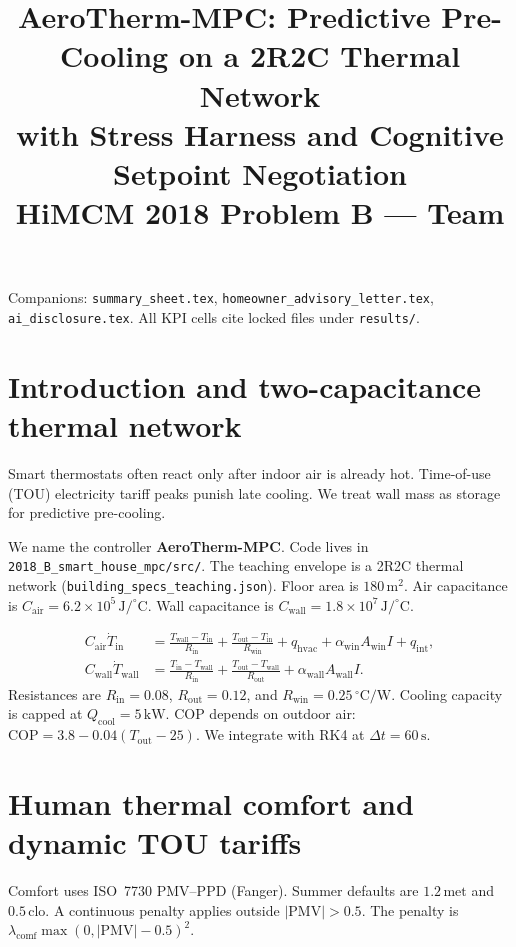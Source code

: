 \documentclass[11pt]{article}
\title{\textbf{AeroTherm-MPC: Predictive Pre-Cooling on a 2R2C Thermal Network\\
with Stress Harness and Cognitive Setpoint Negotiation}\\[0.3em]
\large HiMCM 2018 Problem B --- Team \TeamNumber}
\author{}\date{}
\begin{document}
\maketitle
\thispagestyle{empty}
\noindent
Companions: \texttt{summary\_sheet.tex}, \texttt{homeowner\_advisory\_letter.tex},
\texttt{ai\_disclosure.tex}.
All KPI cells cite locked files under \texttt{results/}.
\tableofcontents
\newpage

\section{Introduction and two-capacitance thermal network}
Smart thermostats often react only after indoor air is already hot.
Time-of-use (TOU) electricity tariff peaks punish late cooling.
We treat wall mass as storage for predictive pre-cooling.

We name the controller \textbf{AeroTherm-MPC}.
Code lives in \texttt{2018\_B\_smart\_house\_mpc/src/}.
The teaching envelope is a 2R2C thermal network
(\texttt{building\_specs\_teaching.json}).
Floor area is $180\,\mathrm{m}^2$.
Air capacitance is $C_{\mathrm{air}}=6.2\times 10^5\,\mathrm{J/^\circ C}$.
Wall capacitance is $C_{\mathrm{wall}}=1.8\times 10^7\,\mathrm{J/^\circ C}$.

\begin{align}
C_{\mathrm{air}}\dot T_{\mathrm{in}}
&=\frac{T_{\mathrm{wall}}-T_{\mathrm{in}}}{R_{\mathrm{in}}}
+\frac{T_{\mathrm{out}}-T_{\mathrm{in}}}{R_{\mathrm{win}}}
+q_{\mathrm{hvac}}+\alpha_{\mathrm{win}}A_{\mathrm{win}}I+q_{\mathrm{int}},\\
C_{\mathrm{wall}}\dot T_{\mathrm{wall}}
&=\frac{T_{\mathrm{in}}-T_{\mathrm{wall}}}{R_{\mathrm{in}}}
+\frac{T_{\mathrm{out}}-T_{\mathrm{wall}}}{R_{\mathrm{out}}}
+\alpha_{\mathrm{wall}}A_{\mathrm{wall}}I.
\end{align}
Resistances are $R_{\mathrm{in}}=0.08$, $R_{\mathrm{out}}=0.12$,
and $R_{\mathrm{win}}=0.25\,^\circ\mathrm{C/W}$.
Cooling capacity is capped at $Q_{\mathrm{cool}}=5\,\mathrm{kW}$.
COP depends on outdoor air:
$\mathrm{COP}=3.8-0.04(T_{\mathrm{out}}-25)$.
We integrate with RK4 at $\Delta t=60\,\mathrm{s}$.

\section{Human thermal comfort and dynamic TOU tariffs}
Comfort uses ISO~7730 PMV--PPD (Fanger).
Summer defaults are $1.2\,\mathrm{met}$ and $0.5\,\mathrm{clo}$.
A continuous penalty applies outside $|\mathrm{PMV}|>0.5$.
The penalty is $\lambda_{\mathrm{comf}}\max(0,|\mathrm{PMV}|-0.5)^2$.
\end{document}
